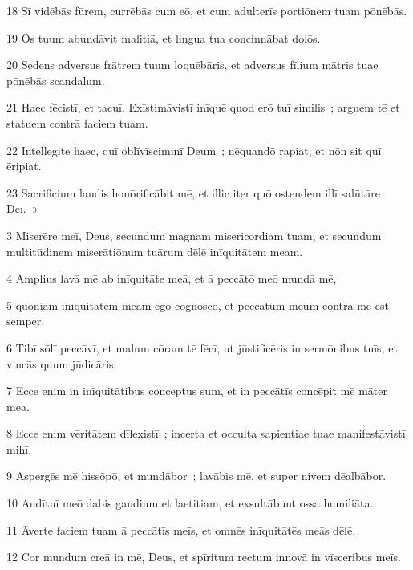 \psalmVerse
  {\phantom{0}18}
  {Sī vidēbās fūrem, currēbās cum eō, et cum adulterīs portiōnem tuam pōnēbās.}


\psalmVerse
  {\phantom{0}19}
  {Ōs tuum abundāvit malitiā, et lingua tua concinnābat dolōs.}


\psalmVerse
  {\phantom{0}20}
  {Sedens adversus frātrem tuum loquēbāris, et adversus fīlium mātris tuae pōnēbās scandalum.}


\psalmVerse
  {\phantom{0}21}
  {Haec fēcistī, et tacuī. Exīstimāvistī inīquē quod erō tuī similis~; arguem tē et statuem contrā faciem tuam.}


\psalmVerse
  {\phantom{0}22}
  {Intellegite haec, quī oblīvīsciminī Deum~; nēquandō rapiat, et nōn sit quī ēripiat.}


\psalmVerse
  {\phantom{0}23}
  {Sacrificium laudis honōrificābit mē, et illic iter quō ostendem illī salūtāre Deī.~»}



\psalmVerse
  {\phantom{00}3}
  {Miserēre meī, Deus, secundum magnam misericordiam tuam, et secundum multitūdinem miserātiōnum tuārum dēlē inīquitātem meam.}


\psalmVerse
  {\phantom{00}4}
  {Amplius lavā mē ab inīquitāte meā, et ā peccātō meō mundā mē,}


\psalmVerse
  {\phantom{00}5}
  {quoniam inīquitātem meam egō cognōscō, et peccātum meum contrā mē est semper.}


\psalmVerse
  {\phantom{00}6}
  {Tibī sōlī peccāvī, et malum cōram tē fēcī, ut jūstificēris in sermōnibus tuīs, et vincās quum jūdicāris.}


\psalmVerse
  {\phantom{00}7}
  {Ecce enim in inīquitātibus conceptus sum, et in peccātīs concēpit mē māter mea.}


\psalmVerse
  {\phantom{00}8}
  {Ecce enim vēritātem dīlexistī~; incerta et occulta sapientiae tuae manifestāvistī mihī.}


\psalmVerse
  {\phantom{00}9}
  {Aspergēs mē hissōpō, et mundābor~; lavābis mē, et super nivem dēalbābor.}


\psalmVerse
  {\phantom{0}10}
  {Audītuī meō dabis gaudium et laetitiam, et exsultābunt ossa humiliāta.}


\psalmVerse
  {\phantom{0}11}
  {Āverte faciem tuam ā peccātīs meīs, et omnēs inīquitātēs meās dēlē.}


\psalmVerse
  {\phantom{0}12}
  {Cor mundum creā in mē, Deus, et spīritum rectum innovā in vīsceribus meīs.}


